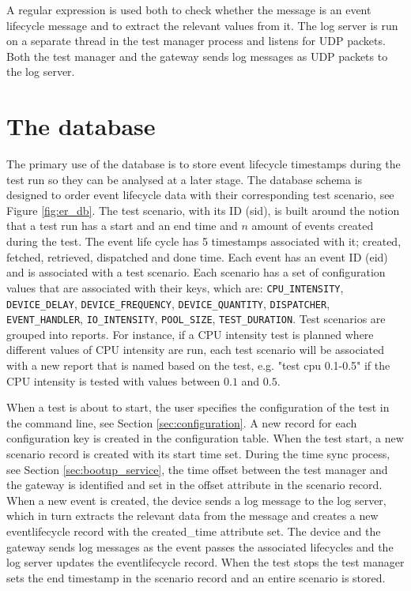 A regular expression is used both to check whether the message is an event
lifecycle message and to extract the relevant values from it. The log server is
run on a separate thread in the test manager process and listens for UDP
packets. Both the test manager and the gateway sends log messages as UDP
packets to the log server.

\section{The database}

The primary use of the database is to store event lifecycle timestamps during
the test run so they can be analysed at a later stage. The database schema is
designed to order event lifecycle data with their corresponding test scenario,
see Figure \ref{fig:er_db}. The test scenario, with its ID (sid), is built
around the notion that a test run has a start and an end time and $n$ amount of
events created during the test. The event life cycle has 5 timestamps
associated with it; created, fetched, retrieved, dispatched and done time. Each
event has an event ID (eid) and is associated with a test scenario. Each
scenario has a set of configuration values that are associated with their keys,
which are: \texttt{CPU\_INTENSITY}, \texttt{DEVICE\_DELAY},
\texttt{DEVICE\_FREQUENCY}, \texttt{DEVICE\_QUANTITY}, \texttt{DISPATCHER},
\texttt{EVENT\_HANDLER}, \texttt{IO\_INTENSITY}, \texttt{POOL\_SIZE},
\texttt{TEST\_DURATION}. Test scenarios are grouped into reports. For instance,
if a CPU intensity test is planned where different values of CPU intensity are
run, each test scenario will be associated with a new report that is named
based on the test, e.g. "test cpu 0.1-0.5" if the CPU intensity is tested with
values between $0.1$ and $0.5$.

When a test is about to start, the user specifies the configuration of the test
in the command line, see Section \ref{sec:configuration}. A new record for each
configuration key is created in the configuration table. When the test start, a
new scenario record is created with its start time set.  During the time sync
process, see Section \ref{sec:bootup_service}, the time offset between the test
manager and the gateway is identified and set in the offset attribute in the
scenario record. When a new event is created, the device sends a log message to
the log server, which in turn extracts the relevant data from the message and
creates a new eventlifecycle record with the created\_time attribute set. The
device and the gateway sends log messages as the event passes the associated
lifecycles and the log server updates the eventlifecycle record. When the test
stops the test manager sets the end timestamp in the scenario record and an
entire scenario is stored.


